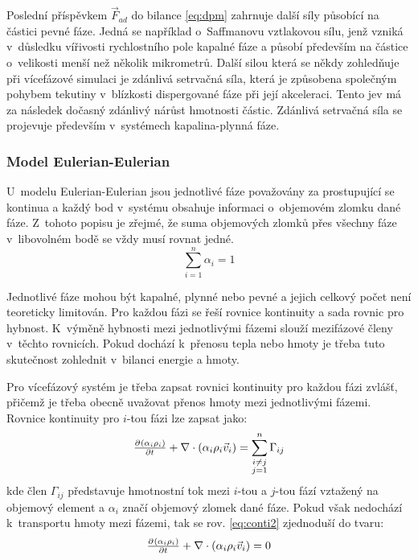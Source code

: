 Poslední příspěvkem $\vec{F}_{ad}$ do bilance \ref{eq:dpm} zahrnuje další síly působící na částici pevné fáze. Jedná se například o~Saffmanovu vztlakovou sílu, jenž vzniká v~důsledku vířivosti rychlostního pole kapalné fáze a působí především na částice o~velikosti menší než několik mikrometrů. Další silou která se někdy zohledňuje při vícefázové simulaci je zdánlivá setrvačná síla, která je způsobena společným pohybem tekutiny v~blízkosti dispergované fáze při její akceleraci. Tento jev má za následek dočasný zdánlivý nárůst hmotnosti částic. Zdánlivá setrvačná síla se projevuje především v~systémech kapalina-plynná fáze.  

\subsubsection{Model Eulerian-Eulerian}
U~modelu Eulerian-Eulerian jsou jednotlivé fáze považovány za prostupující se kontinua a každý bod v~systému obsahuje informaci o~objemovém zlomku dané fáze. Z~tohoto popisu je zřejmé, že suma objemových zlomků přes všechny fáze v~libovolném bodě se vždy musí rovnat jedné. 
\begin{equation}
	\sum_{i=1}^n \alpha_{i} = 1
	\label{eq:volfrac}
\end{equation} 

Jednotlivé fáze mohou být kapalné, plynné nebo pevné a jejich celkový počet není teoreticky limitován. Pro každou fázi se řeší rovnice kontinuity a sada rovnic pro hybnost. K~výměně hybnosti mezi jednotlivými fázemi slouží mezifázové členy v~těchto rovnicích. Pokud dochází k~přenosu tepla nebo hmoty je třeba tuto skutečnost zohlednit v~bilanci energie a hmoty.    

Pro vícefázový systém je třeba zapsat rovnici kontinuity pro každou fázi zvlášť, přičemž je třeba obecně uvažovat přenos hmoty mezi jednotlivými fázemi. Rovnice kontinuity pro $i$-tou fázi lze zapsat jako:
\begin{equation}
	\pd{\kula{\alpha_{i}\rho_{i}}}{t} +  \nabla \cdot (\alpha_{i}\rho_{i}\vec{v}_{i}) = \sum_{\substack{ i \neq j \\ j=1}}^{n}\Gamma_{ij}
	\label{eq:conti2}
\end{equation} 
kde člen $\Gamma_{ij}$ představuje hmotnostní tok mezi $i$-tou a $j$-tou fází vztažený na objemový element a $\alpha_{i}$ značí objemový zlomek dané fáze. Pokud však nedochází k~transportu hmoty mezi fázemi, tak se rov. \ref{eq:conti2} zjednoduší do tvaru:
\begin{equation}
	\pd{\kula{\alpha_{i}\rho_{i}}}{t} +  \nabla \cdot (\alpha_{i}\rho_{i}\vec{v}_{i}) = 0
	\label{eq:conti3}
\end{equation} 

